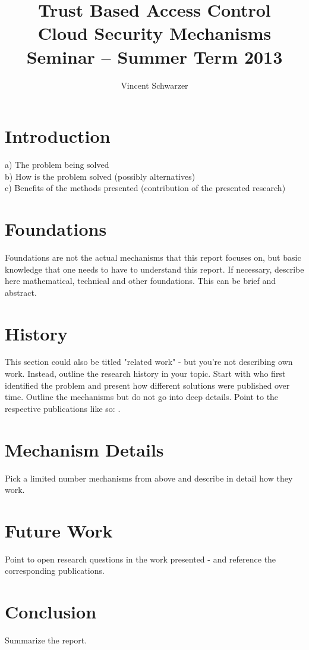 \documentclass[12pt,a4paper,oneside]{article}
\date{}
\title{Trust Based Access Control \\ \small Cloud Security Mechanisms Seminar -- Summer Term 2013}
\author{Vincent Schwarzer}
\begin{document}
\maketitle


\section{Introduction}
a) The problem being solved\\
b) How is the problem solved (possibly alternatives)\\
c) Benefits of the methods presented (contribution of the presented research)\\

\section{Foundations}
Foundations are not the actual mechanisms that this report focuses on, but basic knowledge that one needs to have to understand this report. If necessary, describe here mathematical, technical and other foundations. This can be brief and abstract.

\section{History}
This section could also be titled "related work" - but you're not describing own work. Instead, outline the research history in your topic. Start with who first identified the problem and present how different solutions were published over time. Outline the mechanisms but do not go into deep details. Point to the respective publications like so: \cite{schechter2004computer,distefano2009dependability,mauw2006foundations,besson2001model,dolev1983security}.

\section{Mechanism Details}
Pick a limited number mechanisms from above and describe in detail how they work.

\section{Future Work}
Point to open research questions in the work presented - and reference the corresponding publications.

\section{Conclusion}
Summarize the report.
\end{document}
